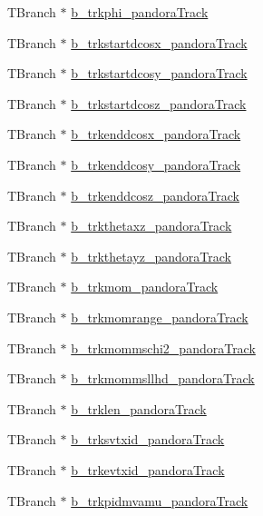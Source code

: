 \begin{DoxyCompactItemize}
T\-Branch $\ast$ \hyperlink{classanatree_a82f05bdd37129948f382b46359c63579}{b\-\_\-trkphi\-\_\-pandora\-Track}
\item 
T\-Branch $\ast$ \hyperlink{classanatree_a38c205267ecbb57908995438749b43ed}{b\-\_\-trkstartdcosx\-\_\-pandora\-Track}
\item 
T\-Branch $\ast$ \hyperlink{classanatree_aea07ba810413c75c05c22d16e222c000}{b\-\_\-trkstartdcosy\-\_\-pandora\-Track}
\item 
T\-Branch $\ast$ \hyperlink{classanatree_a36feb3589817a5bd0431cade34ece996}{b\-\_\-trkstartdcosz\-\_\-pandora\-Track}
\item 
T\-Branch $\ast$ \hyperlink{classanatree_a35f18863079da3510c2b203cb0dc63a0}{b\-\_\-trkenddcosx\-\_\-pandora\-Track}
\item 
T\-Branch $\ast$ \hyperlink{classanatree_abdbaf3a2673795d79336932b27046308}{b\-\_\-trkenddcosy\-\_\-pandora\-Track}
\item 
T\-Branch $\ast$ \hyperlink{classanatree_aa92df6504e77bb1b812f64a92fa60c45}{b\-\_\-trkenddcosz\-\_\-pandora\-Track}
\item 
T\-Branch $\ast$ \hyperlink{classanatree_af7cf0dc9b50e153a03e509ceeb580e5c}{b\-\_\-trkthetaxz\-\_\-pandora\-Track}
\item 
T\-Branch $\ast$ \hyperlink{classanatree_a91e36647bf3e09234016a2e0a0c3f7e1}{b\-\_\-trkthetayz\-\_\-pandora\-Track}
\item 
T\-Branch $\ast$ \hyperlink{classanatree_a9ab3395c21f184f841c34055bf61c341}{b\-\_\-trkmom\-\_\-pandora\-Track}
\item 
T\-Branch $\ast$ \hyperlink{classanatree_a8c596f870bc8c1c2260ff93b757efa6c}{b\-\_\-trkmomrange\-\_\-pandora\-Track}
\item 
T\-Branch $\ast$ \hyperlink{classanatree_adff23f0d3e964de61ba28b8b99062c09}{b\-\_\-trkmommschi2\-\_\-pandora\-Track}
\item 
T\-Branch $\ast$ \hyperlink{classanatree_a973b219744deea321547c65c1ff09db8}{b\-\_\-trkmommsllhd\-\_\-pandora\-Track}
\item 
T\-Branch $\ast$ \hyperlink{classanatree_a93475fed52d95766aca06675d262da2f}{b\-\_\-trklen\-\_\-pandora\-Track}
\item 
T\-Branch $\ast$ \hyperlink{classanatree_af41fa3b3917603256c23c0992d2b6f92}{b\-\_\-trksvtxid\-\_\-pandora\-Track}
\item 
T\-Branch $\ast$ \hyperlink{classanatree_a4ec2081d324c9899ab98369a8855c199}{b\-\_\-trkevtxid\-\_\-pandora\-Track}
\item 
T\-Branch $\ast$ \hyperlink{classanatree_a3b45b5181c44103280780aae822217f9}{b\-\_\-trkpidmvamu\-\_\-pandora\-Track}

\end{DoxyCompactItemize}
